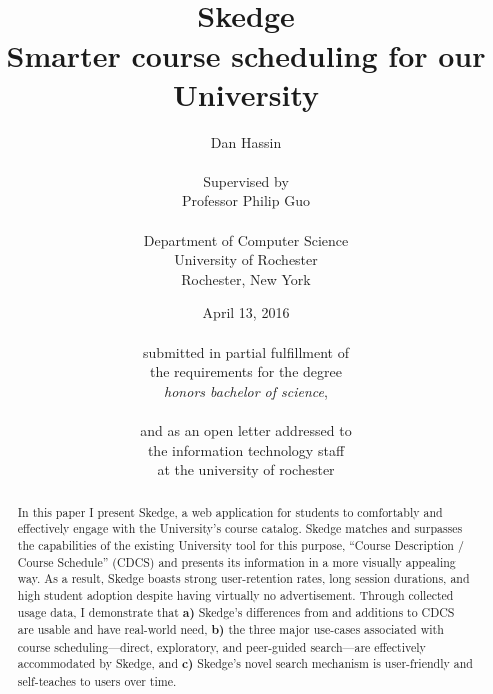 \documentclass[titlepage]{report}
\title{
\vspace{60pt}\\
\huge \bfseries Skedge \\
\vspace{10pt}
\Large
Smarter course scheduling for our University
}
\author{
	Dan Hassin\\
    \vspace{5pt}\\
    Supervised by\\
    Professor Philip Guo\\
    \vspace{2pt}\\
    Department of Computer Science\\
    University of Rochester\\
    Rochester, New York\\
}
\date{April 13, 2016\\
    \vspace{80pt}\\
    submitted in partial fulfillment of\\
    the requirements for the degree\\
    \emph{honors bachelor of science},\\
    \vspace{40pt}\\
    and as an open letter addressed to\\
    the information technology staff\\
    at the university of rochester
    \vspace{-80pt}
}
\begin{document}
\maketitle


\onehalfspacing

\setcounter{tocdepth}{1}
\tableofcontents

\listoffigures

\clearpage


\doublespacing


\begin{abstract}

\thispagestyle{plain}

In this paper I present Skedge, a web application for students to comfortably and effectively engage with the University's course catalog. Skedge matches and surpasses the capabilities of the existing University tool for this purpose, ``Course Description / Course Schedule'' (CDCS) and presents its information in a more visually appealing way. As a result, Skedge boasts strong user-retention rates, long session durations, and high student adoption despite having virtually no advertisement. Through collected usage data, I demonstrate that \textbf{a)} Skedge's differences from and additions to CDCS are usable and have real-world need, \textbf{b)} the three major use-cases associated with course scheduling---direct, exploratory, and peer-guided search---are effectively accommodated by Skedge, and \textbf{c)} Skedge's novel search mechanism is user-friendly and self-teaches to users over time.

\end{abstract}




\setlength{\skip\footins}{0.75cm}



\clearpage


\clearpage


\clearpage


\clearpage


\clearpage


\singlespacing


\begin{spacing}{1.1}




\end{spacing}


\end{document}
